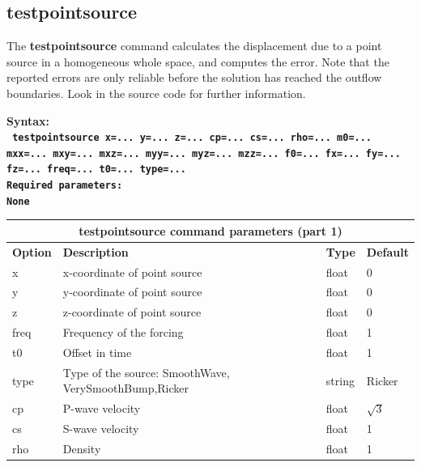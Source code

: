 \documentclass[11pt]{report}
\begin{document}
\subsection{testpointsource}
\label{keyword:pointsource}
The {\bf testpointsource} command calculates the displacement due to a point source in a homogeneous
whole space, and computes the error. Note that the reported errors are only reliable before the
solution has reached the outflow boundaries. Look in the source code for further information.
\begin{flushleft}
\bf
Syntax:\\
\tt
testpointsource
x=... y=... z=... cp=... cs=... rho=... m0=... mxx=... mxy=... mxz=... myy=... myz=... mzz=... f0=... fx=... fy=... fz=... freq=... t0=... type=...
\\
\bf 
Required parameters:\\
\rm
None
\end{flushleft}
\begin{center}
\begin{tabular}{|l|p{8cm}|l|l|} \hline
\multicolumn{4}{|c|}{\bf testpointsource command parameters (part 1)}\\ \hline
\bf{Option} & \bf{Description} & \bf{Type} & \bf{Default} \\ \hline \hline
x    & x-coordinate of point source & float & 0 \\ \hline
y    & y-coordinate of point source & float & 0 \\ \hline
z    & z-coordinate of point source & float & 0 \\ \hline
\hline
freq & Frequency of the forcing & float & 1 \\ \hline
t0   & Offset in time & float & 1 \\ \hline
type & Type of the source: SmoothWave, VerySmoothBump,Ricker & string & Ricker \\ \hline
\hline
cp   & P-wave velocity & float & $\sqrt{3}$ \\ \hline
cs   & S-wave velocity & float & 1 \\ \hline
rho  & Density & float & 1 \\ \hline
\end{tabular}
\end{center}
\end{document}
